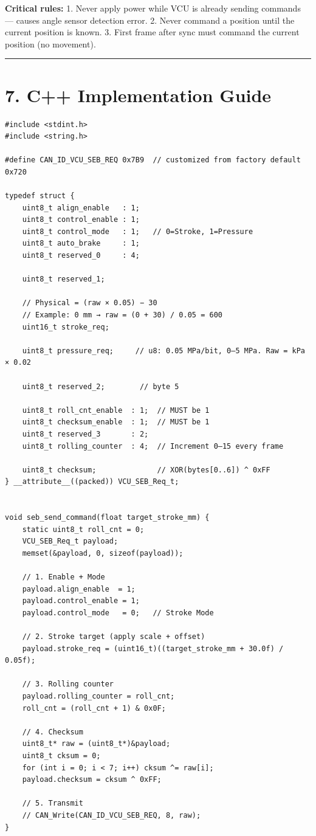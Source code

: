 \documentclass[12pt,a4paper,oneside]{report}
\begin{document}
\textbf{Critical rules:} 1. Never apply power while VCU is already sending
commands --- causes angle sensor detection error. 2. Never command a position
until the current position is known. 3. First frame after sync must command the
current position (no movement).

\begin{center}\rule{0.5\linewidth}{0.5pt}\end{center}

\section{7. C++ Implementation Guide}\label{c-implementation-guide}

\begin{verbatim}
#include <stdint.h>
#include <string.h>

#define CAN_ID_VCU_SEB_REQ 0x7B9  // customized from factory default 0x720

typedef struct {
    uint8_t align_enable   : 1;
    uint8_t control_enable : 1;
    uint8_t control_mode   : 1;   // 0=Stroke, 1=Pressure
    uint8_t auto_brake     : 1;
    uint8_t reserved_0     : 4;

    uint8_t reserved_1;

    // Physical = (raw × 0.05) − 30
    // Example: 0 mm → raw = (0 + 30) / 0.05 = 600
    uint16_t stroke_req;

    uint8_t pressure_req;     // u8: 0.05 MPa/bit, 0–5 MPa. Raw = kPa × 0.02

    uint8_t reserved_2;        // byte 5

    uint8_t roll_cnt_enable  : 1;  // MUST be 1
    uint8_t checksum_enable  : 1;  // MUST be 1
    uint8_t reserved_3       : 2;
    uint8_t rolling_counter  : 4;  // Increment 0–15 every frame

    uint8_t checksum;              // XOR(bytes[0..6]) ^ 0xFF
} __attribute__((packed)) VCU_SEB_Req_t;


void seb_send_command(float target_stroke_mm) {
    static uint8_t roll_cnt = 0;
    VCU_SEB_Req_t payload;
    memset(&payload, 0, sizeof(payload));

    // 1. Enable + Mode
    payload.align_enable  = 1;
    payload.control_enable = 1;
    payload.control_mode   = 0;   // Stroke Mode

    // 2. Stroke target (apply scale + offset)
    payload.stroke_req = (uint16_t)((target_stroke_mm + 30.0f) / 0.05f);

    // 3. Rolling counter
    payload.rolling_counter = roll_cnt;
    roll_cnt = (roll_cnt + 1) & 0x0F;

    // 4. Checksum
    uint8_t* raw = (uint8_t*)&payload;
    uint8_t cksum = 0;
    for (int i = 0; i < 7; i++) cksum ^= raw[i];
    payload.checksum = cksum ^ 0xFF;

    // 5. Transmit
    // CAN_Write(CAN_ID_VCU_SEB_REQ, 8, raw);
}
\end{verbatim}
\end{document}
